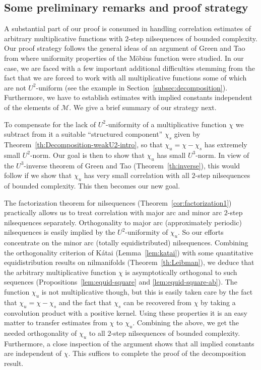 \documentclass[11pt]{amsart}
\theoremstyle{definition}
\begin{document}
\subsection{Some preliminary remarks and proof strategy}
\label{subsec:prelim}   A substantial  part of our proof is consumed
in handling  correlation estimates of  arbitrary multiplicative
functions with  $2$-step nilsequences of bounded complexity. Our
proof strategy  follows the general ideas of an argument of Green
and Tao from \cite{GT08a,GT12b} where uniformity
properties of  the M\"{o}bius function were studied. In our case, we
are faced with a few important additional difficulties   stemming
from the fact that we are forced to work with all multiplicative
functions some of which are not $U^2$-uniform (see the example in
Section~\ref{subsec:decomposition}). Furthermore, we have to
 establish estimates with implied constants independent of
the elements of ${{\mathcal M}}$.
We give a brief summary of our strategy next.

 To
compensate for the lack of $U^2$-uniformity of a multiplicative function $\chi$  we  subtract from
 it   a suitable ``structured component''  $\chi_s$ given by
 Theorem~\ref{th:Decomposition-weakU2-intro},
 so
that $\chi_u=\chi-\chi_s$ has extremely small  $U^2$-norm. Our goal
is then to show that  $\chi_u$ has small $U^3$-norm.
 In view of the $U^3$-inverse
theorem of Green and Tao (Theorem~\ref{th:inverse}), this would
follow if we show that $\chi_{u}$  has very small correlation with
all $2$-step nilsequences of bounded complexity. This then  becomes
our new goal.

The factorization theorem for nilsequences
(Theorem~\ref{cor:factorization1}) practically allows us    to treat
correlation with major arc and minor arc $2$-step nilsequences
separately.
 Orthogonality to  major arc (approximately periodic) nilsequences  is easily implied by the  $U^2$-uniformity of $\chi_u$. So our efforts concentrate on the  minor arc (totally equidistributed) nilsequences.
Combining the orthogonality criterion of K\'atai (Lemma~\ref{lem:katai}) with  some
quantitative equidistribution results on nilmanifolds (Theorem~\ref{th:Leibman}), we deduce
 that the arbitrary multiplicative function $\chi$ is asymptotically orthogonal to such sequences (Propositions~\ref{lem:equid-square}
 and \ref{lem:equid-square-ab}).
  The function $\chi_u$ is not multiplicative though, but this is easily taken care by the fact that $\chi_u=\chi-\chi_s$ and
  the fact that $\chi_s$  can be recovered from $\chi$ by taking a convolution product with a positive kernel.
  Using these properties it is an easy matter to transfer estimates from $\chi$ to $\chi_u$.
   Combining the above, we get
  the needed orthogonality of $\chi_u$ to all $2$-step nilsequences of bounded
  complexity. Furthermore, a close inspection of the argument shows that all implied constants are independent of $\chi$.
This suffices to complete the proof of the decomposition result.
\end{document}
